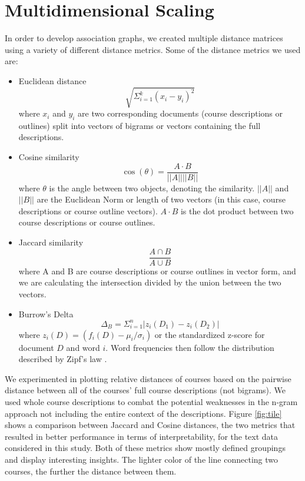 \section{Multidimensional Scaling}

In order to develop association graphs, we created multiple distance matrices using a variety of different distance metrics.  Some of the distance metrics we used are: 
\begin{itemize}
\item Euclidean distance  
$$\sqrt{\Sigma_{i = 1}^{k}(x_i - y_i)^2}$$
where $x_i$ and $y_i$ are two corresponding documents (course descriptions or outlines) split into vectors of bigrams or vectors containing the full descriptions.
\item Cosine similarity
$$ \cos (\theta) = \frac{A \cdot B}{|| A || || B||}$$
where $\theta$ is the angle between two objects, denoting the similarity.  $||A||$ and $||B||$ are the Euclidean Norm or length of two vectors (in this case, 
course descriptions or course outline vectors). $A \cdot B$ is the dot product  between two course descriptions or course outlines. 
\item Jaccard similarity  
$$\frac{A \cap B}{A \cup B}$$
where A and B are course descriptions or course outlines in vector form, and we are calculating the intersection divided by the union between the two vectors.
\item Burrow's Delta  \cite{burrow}
$$\Delta_B = \Sigma_{i = 1}^n | z_i(D_1) - z_i(D_2)|$$
where $z_i(D) = (f_i(D) - \mu_i/\sigma_i)$ or the standardized z-score for document $D$ and word $i$.  Word frequencies then follow the distribution described 
by Zipf's law \cite{zipf2013psycho}. 

\end{itemize} 

We experimented in plotting relative distances of courses based on the pairwise distance between all of the courses' full course descriptions (not bigrams).  
We used whole course descriptions to combat the potential weaknesses in the n-gram approach not including the entire context of the descriptions.   
Figure \ref{fig:tile} shows a comparison between Jaccard and Cosine distances, the two metrics that resulted in better performance in terms of interpretability,  
for the text data considered in this study. Both of these metrics show mostly defined groupings and display interesting insights. The lighter color of the 
line connecting two courses, the further the distance between them.


